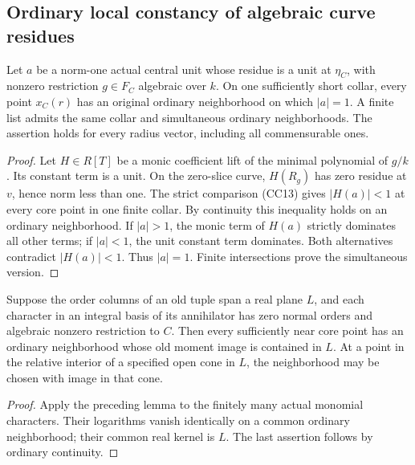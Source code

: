 \subsection{Ordinary local constancy of algebraic curve residues}

\begin{lemma}
\label{lem:r13-cc-polynomial-constancy}
Let \(a\) be a norm-one actual central unit whose residue is a
unit at \(\eta_C\), with nonzero restriction \(g\in F_C\)
algebraic over \(k\).  On one sufficiently short collar, every
point \(x_C(r)\) has an original ordinary neighborhood on which
\(|a|=1\).  A finite list admits the same collar and simultaneous
ordinary neighborhoods.  The assertion holds for every radius
vector, including all commensurable ones.
\end{lemma}

\begin{proof}
Let \(H\in R[T]\) be a monic coefficient lift of the minimal
polynomial of \(g/k\).  Its constant term is a unit.  On the
zero-slice curve, \(H(R_g)\) has zero residue at \(v\), hence
norm less than one.  The strict comparison (CC13) gives
\(|H(a)|<1\) at every core point in one finite collar.  By
continuity this inequality holds on an ordinary neighborhood.
If \(|a|>1\), the monic term of \(H(a)\) strictly dominates all
other terms; if \(|a|<1\), the unit constant term dominates.
Both alternatives contradict \(|H(a)|<1\).  Thus \(|a|=1\).
Finite intersections prove the simultaneous version.
\end{proof}

\begin{corollary}
\label{cor:r13-cc-tangent-plane-constancy}
Suppose the order columns of an old tuple span a real plane
\(L\), and each character in an integral basis of its annihilator
has zero normal orders and algebraic nonzero restriction to
\(C\).  Then every sufficiently near core point has an ordinary
neighborhood whose old moment image is contained in \(L\).
At a point in the relative interior of a specified open cone in
\(L\), the neighborhood may be chosen with image in that cone.
\end{corollary}

\begin{proof}
Apply the preceding lemma to the finitely many actual monomial
characters.  Their logarithms vanish identically on a common
ordinary neighborhood; their common real kernel is \(L\).
The last assertion follows by ordinary continuity.
\end{proof}

